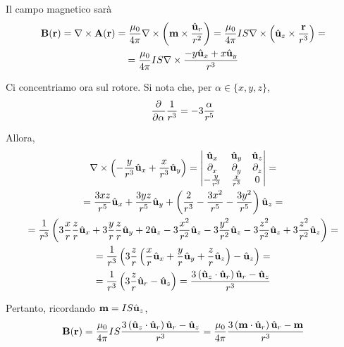 Il campo magnetico sarà
\begin{equation}
\begin{gathered}
    \mathbf{B}(\mathbf{r}) = \nabla \times \mathbf{A}(\mathbf{r}) = \frac{\mu_0}{4\pi} \nabla \times \left( \mathbf{m} \times \frac{\hat{\mathbf{u}}_{r}}{r^2} \right)
    = \frac{\mu_0}{4\pi} I S \nabla \times \left( \hat{\mathbf{u}}_{z} \times \frac{\mathbf{r}}{r^3} \right) = \\
    = \frac{\mu_0}{4\pi} I S \nabla \times \frac{-y\hat{\mathbf{u}}_{x} + x\hat{\mathbf{u}}_{y}}{r^3}
\end{gathered}
\end{equation}

Ci concentriamo ora sul rotore.
Si nota che, per $\alpha \in \{x, y, z\}$,
\begin{equation}
    \parder{\alpha} \frac{1}{r^3} = -3 \frac{\alpha}{r^5}
\end{equation}

Allora,
\begin{equation}
\begin{gathered}
    \curl \pts{-\frac{y}{r^3} \ux + \frac{x}{r^3}\uy}
    = \begin{vmatrix}
        \ux & \uy & \uz \\
        \parder{x} & \parder{y} & \parder{z} \\
        -\frac{y}{r^3} & \frac{x}{r^3} & 0
    \end{vmatrix} = \\
    = \frac{3 x z}{r^5} \ux + \frac{3 y z}{r^5} \uy + \pts{\frac{2}{r^3} - \frac{3 x^2}{r^5} - \frac{3 y^2}{r^5}} \uz = \\
    = \frac{1}{r^3} \pts{
        3 \frac{x}{r} \frac{z}{r} \ux +
        3 \frac{y}{r} \frac{z}{r} \uy +
        2 \uz
        - 3 \frac{x^2}{r^2} \uz
        - 3 \frac{y^2}{r^2} \uz
        - 3 \frac{z^2}{r^2} \uz
        + 3 \frac{z^2}{r^2} \uz
    } = \\
    = \frac{1}{r^3} \pts{
        3 \frac{z}{r} \pts{
            \frac{x}{r} \ux +
            \frac{y}{r} \uy +
            \frac{z}{r} \uz
        } - \uz
    } = \\
    = \frac{1}{r^3} \pts{3 \frac{z}{r} \ver{r} - \uz}
    = \frac{3 \pts{\uz \cdot \ver{r}} \ver{r} - \uz}{r^3}
\end{gathered}
\end{equation}

Pertanto, ricordando $\mathbf{m} = I S \hat{\mathbf{u}}_{z}$,
\begin{equation}
    \mathbf{B}(\mathbf{r}) = \frac{\mu_0}{4\pi} I S \frac{3 \left( \hat{\mathbf{u}}_{z} \cdot \hat{\mathbf{u}}_{r} \right) \hat{\mathbf{u}}_{r} - \hat{\mathbf{u}}_{z}}{r^3}
    = \frac{\mu_0}{4\pi} \frac{3 \left( \mathbf{m} \cdot \hat{\mathbf{u}}_{r} \right) \hat{\mathbf{u}}_{r} - \mathbf{m}}{r^3}
\end{equation}

